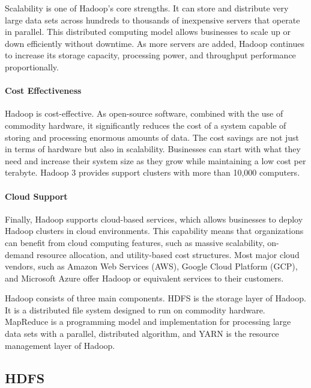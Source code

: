Scalability is one of Hadoop's core strengths. It can store and distribute very large data sets across hundreds to thousands of inexpensive servers that operate in parallel. This distributed computing model allows businesses to scale up or down efficiently without downtime. As more servers are added, Hadoop continues to increase its storage capacity, processing power, and throughput performance proportionally.

\paragraph*{Cost Effectiveness}

Hadoop is cost-effective. As open-source software, combined with the use of commodity hardware, it significantly reduces the cost of a system capable of storing and processing enormous amounts of data. The cost savings are not just in terms of hardware but also in scalability. Businesses can start with what they need and increase their system size as they grow while maintaining a low cost per terabyte. Hadoop 3 provides support clusters with more than 10,000 computers.

\paragraph*{Cloud Support}

Finally, Hadoop supports cloud-based services, which allows businesses to deploy Hadoop clusters in cloud environments. This capability means that organizations can benefit from cloud computing features, such as massive scalability, on-demand resource allocation, and utility-based cost structures. Most major cloud vendors, such as Amazon Web Services (AWS), Google Cloud Platform (GCP), and Microsoft Azure offer Hadoop or equivalent services to their customers.

Hadoop consists of three main components. HDFS is the storage layer of Hadoop. It is a distributed file system designed to run on commodity hardware. MapReduce is a programming model and implementation for processing large data sets with a parallel, distributed algorithm, and YARN is the resource management layer of Hadoop. 

\subsection{HDFS}


